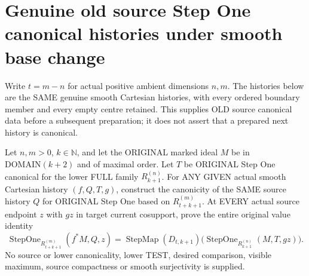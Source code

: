 \section{Genuine old source Step One canonical histories under smooth base change}

Write $t=m-n$ for actual positive ambient dimensions $n,m$. The histories
below are the SAME genuine smooth Cartesian histories, with every ordered
boundary member and every empty centre retained. This supplies OLD source
canonical data before a subsequent preparation; it does not assert that a
prepared next history is canonical.

\begin{theorem}
\label{hir:original-source-stepone-canonical-smooth-history}
\leanok
Let $n,m>0$, $k\in\mathbb N$, and let the ORIGINAL marked ideal $M$ be in
$\mathrm{DOMAIN}(k+2)$ and of maximal order. Let $T$ be ORIGINAL Step One
canonical for the lower FULL family $R^{(n)}_{k+1}$. For ANY GIVEN actual
smooth Cartesian history $(f,Q,T,g)$, construct the canonicity of the
SAME source history $Q$ for ORIGINAL Step One based on
$R^{(m)}_{t+k+1}$. At EVERY actual source endpoint $z$ with $gz$ in target
current cosupport, prove the entire original value identity
\[
 \operatorname{StepOne}_{R^{(m)}_{t+k+1}}(f^*M,Q,z)
 =\operatorname{StepMap}(D_{t,k+1})
       \bigl(\operatorname{StepOne}_{R^{(n)}_{k+1}}(M,T,gz)\bigr).
\]
No source or lower canonicality, lower TEST, desired comparison, visible
maximum, source compactness or smooth surjectivity is supplied.
\end{theorem}
